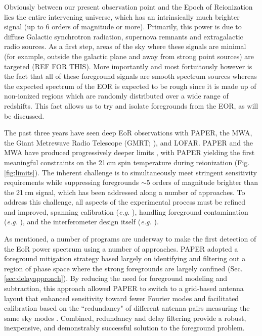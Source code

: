 \documentclass[preprint,11pt]{aastex}
\begin{document}
Obviously between our present observation point and the Epoch of Reionization lies the entire intervening universe, which has an intrinsically much brighter signal (up to 6 orders of magnitude or more).  Primarily, this power is due to diffuse Galactic synchrotron radiation, supernova remnants and extragalactic radio sources.  As a first step, areas of the sky where these signals are minimal (for example, outside the galactic plane and away from strong point sources) are targeted (REF FOR THIS).  More importantly and most fortuitously however is the fact that all of these foreground signals are smooth spectrum sources whereas the expected spectrum of the EOR is expected to be rough since it is made up of non-ionized regions which are randomly distributed over a wide range of redshifts.  This fact allows us to try and isolate foregrounds from the EOR, as will be discussed.

The past three years have seen deep EoR observations with PAPER, the MWA, 
the Giant Metrewave Radio Telescope (GMRT; \citealt{paciga_et_al2013}), and LOFAR.
PAPER and the MWA have produced progressively deeper limits
\citep{dillon_et_al2015,parsons_etal2014,ali_et_al2015}, with PAPER
yielding the first meaningful constraints on the 21\,cm spin temperature during reionization
(Fig. \ref{fig:limits}).
The inherent challenge is to simultaneously meet stringent sensitivity requirements 
while suppressing foregrounds $\sim5$ orders of magnitude
brighter than the 21\,cm signal, which has been addressed along a number of approaches.  
To address this challenge,  all aspects of the experimental process must be refined and improved, spanning 
calibration ({\em e.g.} \cite{zheng_et_al2014, jacobs_et_al2016, barry_et_al2016}), handling foreground contamination
({\em e.g.} \cite{moore_et_al2013,moore_et_al2016,thyagarajan_et_al2015a,pober_et_al2016}),
and the interferometer design itself ({\em e.g.} \cite{parsons_et_al2012a,dillon_parsons2016}).

As mentioned, a number of programs are underway to make the first detection of the EoR power spectrum using a number of approaches.  
PAPER adopted a foreground mitigation strategy based largely
on identifying and filtering out a region of phase space where the strong foregrounds are largely confined (Sec. \ref{sec:delayapproach}).  
By reducing the need
for foreground modeling and subtraction, this approach allowed PAPER to switch to a grid-based antenna layout that
enhanced sensitivity toward fewer Fourier modes and facilitated calibration
based on the ``redundancy" of different antenna pairs measuring the same sky modes \citep{liu_et_al2010,zheng_et_al2014}.
Combined, redundancy and delay filtering provide a robust, inexpensive, and demonstrably successful solution 
to the foreground problem.
\end{document}
